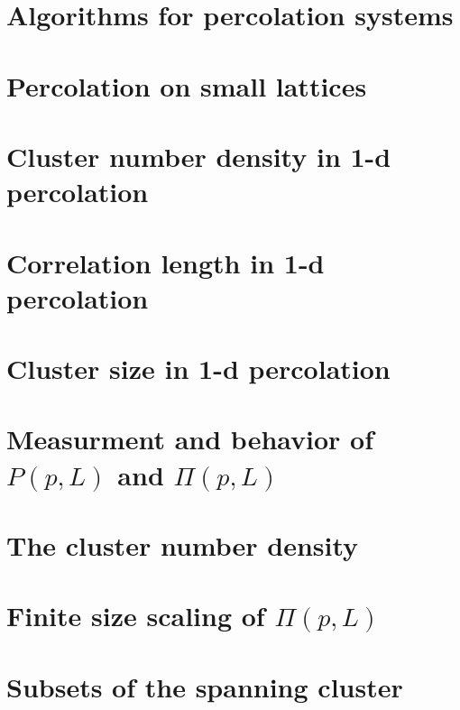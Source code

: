 \documentclass[a4paper,english, 10pt, twoside]{article}
\begin{document}
\section{Algorithms for percolation systems}

\section{Percolation on small lattices}

\section{Cluster number density in 1-d percolation}

\section{Correlation length in 1-d percolation}

\section{Cluster size in 1-d percolation}

\section{Measurment and behavior of $P(p,L)$ and $\Pi(p,L)$}

\section{The cluster number density}

\section{Finite size scaling of $\Pi(p,L)$}

\section{Subsets of the spanning cluster}
\end{document}
